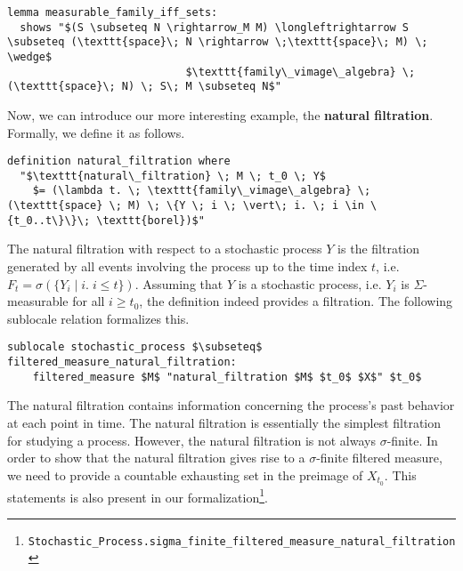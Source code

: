 \begin{isalemma}
{\small
\begin{lstlisting}[style=isabelle]
lemma measurable_family_iff_sets:
  shows "$(S \subseteq N \rightarrow_M M) \longleftrightarrow S \subseteq (\texttt{space}\; N \rightarrow \;\texttt{space}\; M) \; \wedge$
                            $\texttt{family\_vimage\_algebra} \; (\texttt{space}\; N) \; S\; M \subseteq N$"
\end{lstlisting}
}
\end{isalemma}

Now, we can introduce our more interesting example, the \textbf{natural filtration}. Formally, we define it as follows.

\begin{isadefinition}
{\small
\begin{lstlisting}[style=isabelle]
definition natural_filtration where
  "$\texttt{natural\_filtration} \; M \; t_0 \; Y$
	$= (\lambda t. \; \texttt{family\_vimage\_algebra} \; (\texttt{space} \; M) \; \{Y \; i \; \vert\; i. \; i \in \{t_0..t\}\}\; \texttt{borel})$"
\end{lstlisting}
}
\end{isadefinition}
The natural filtration with respect to a stochastic process $Y$ is the filtration generated by all events involving the process up to the time index $t$, i.e. $F_t = \sigma(\{Y_i \; \vert\; i. \; i \le t\})$. Assuming that $Y$ is a stochastic process, i.e. $Y_i$ is $\Sigma$-measurable for all $i \ge t_0$, the definition indeed provides a filtration. The following sublocale relation formalizes this.

\begin{isalemma}
{\small
\begin{lstlisting}[style=isabelle]
sublocale stochastic_process $\subseteq$ filtered_measure_natural_filtration: 
	filtered_measure $M$ "natural_filtration $M$ $t_0$ $X$" $t_0$
\end{lstlisting}
}
\end{isalemma}

The natural filtration contains information concerning the process's past behavior at each point in time. The natural filtration is essentially the simplest filtration for studying a process. However, the natural filtration is not always $\sigma$-finite. In order to show that the natural filtration gives rise to a $\sigma$-finite filtered measure, we need to provide a countable exhausting set in the preimage of $X_{t_0}$. This statements is also present in our formalization\footnote{\texttt{Stochastic\_Process.sigma\_finite\_filtered\_measure\_natural\_filtration}}.

